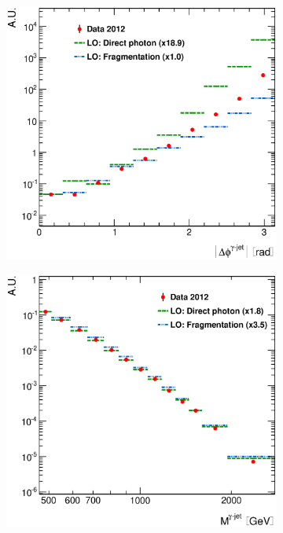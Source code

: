 \documentclass[12pt, twoside]{article}
\numberwithin{equation}{section}
\numberwithin{figure}{section}
\newenvironment{changemargin}[2]{%
\begin{list}{}{%
\setlength{\topsep}{0pt}%
\setlength{\leftmargin}{#1}%
\setlength{\rightmargin}{#2}%
\setlength{\listparindent}{\parindent}%
\setlength{\itemindent}{\parindent}%
\setlength{\parsep}{\parskip}%
}%
\item[]}{\end{list}}
\begin{document}
\begin{figure}
\begin{changemargin}{-1.0cm}{-0.75cm}
\begin{changemargin}{-0.75cm}{-1.0cm}
        \vspace{0.2cm}
        \begin{subfigure}[b]{0.37\textwidth}
            \includegraphics[width=\textwidth]{./images/DifferentialCrossSectionsDPFP/NORM_DIFF_CRSS_SEC-107.eps}
            \subcaption{}
            \label{fig:DiffCrossSectDPFPDeltaPhiPhotonJet}
        \end{subfigure}
        \begin{subfigure}[b]{0.37\textwidth}
            \includegraphics[width=\textwidth]{./images/DifferentialCrossSectionsDPFP/NORM_DIFF_CRSS_SEC-108.eps}

\end{subfigure}
\end{changemargin}
\end{changemargin}
\end{figure}
\end{document}
